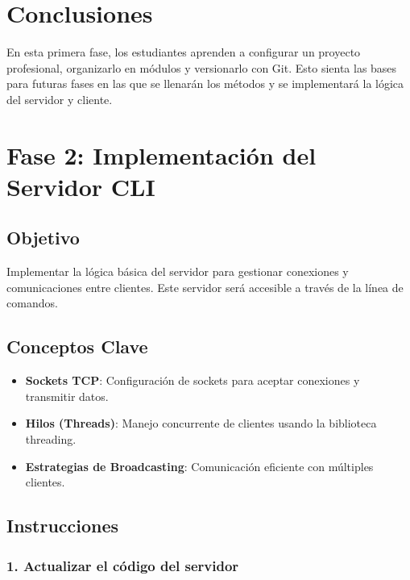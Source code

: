 \documentclass[
  a4paper,
  DIV=11,
  numbers=noendperiod,
  onepage,
  openany]{scrreprt}
\begin{document}
\chapter{Conclusiones}\label{conclusiones-13}

En esta primera fase, los estudiantes aprenden a configurar un proyecto
profesional, organizarlo en módulos y versionarlo con Git. Esto sienta
las bases para futuras fases en las que se llenarán los métodos y se
implementará la lógica del servidor y cliente.

\chapter{Fase 2: Implementación del Servidor
CLI}\label{fase-2-implementaciuxf3n-del-servidor-cli}

\section{Objetivo}\label{objetivo-2}

Implementar la lógica básica del servidor para gestionar conexiones y
comunicaciones entre clientes. Este servidor será accesible a través de
la línea de comandos.

\section{Conceptos Clave}\label{conceptos-clave-16}

\begin{itemize}
\item
  \textbf{Sockets TCP}: Configuración de sockets para aceptar conexiones
  y transmitir datos.
\item
  \textbf{Hilos (Threads)}: Manejo concurrente de clientes usando la
  biblioteca threading.
\item
  \textbf{Estrategias de Broadcasting}: Comunicación eficiente con
  múltiples clientes.
\end{itemize}

\section{Instrucciones}\label{instrucciones-12}

\subsection{1. Actualizar el código del
servidor}\label{actualizar-el-cuxf3digo-del-servidor}
\end{document}
